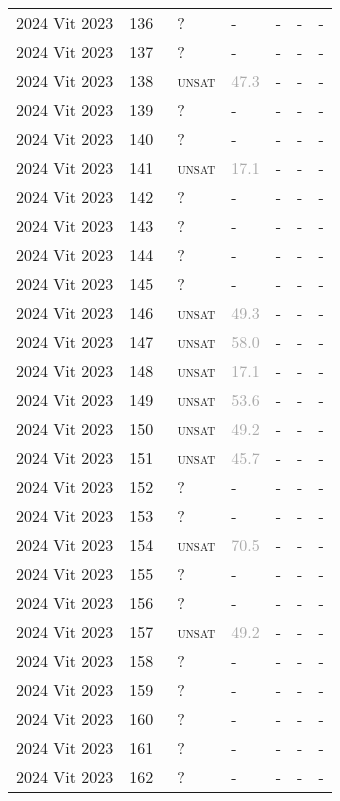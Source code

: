 \begin{center}
{\begin{longtable}{@{}lllllll@{}}
2024 Vit 2023 & 136 & ~? & - & - & - & - \\
2024 Vit 2023 & 137 & ~? & - & - & - & - \\
2024 Vit 2023 & 138 & ~\textsc{unsat} & \textcolor{darkgray}{47.3} & - & - & - \\
2024 Vit 2023 & 139 & ~? & - & - & - & - \\
2024 Vit 2023 & 140 & ~? & - & - & - & - \\
2024 Vit 2023 & 141 & ~\textsc{unsat} & \textcolor{darkgray}{17.1} & - & - & - \\
2024 Vit 2023 & 142 & ~? & - & - & - & - \\
2024 Vit 2023 & 143 & ~? & - & - & - & - \\
2024 Vit 2023 & 144 & ~? & - & - & - & - \\
2024 Vit 2023 & 145 & ~? & - & - & - & - \\
2024 Vit 2023 & 146 & ~\textsc{unsat} & \textcolor{darkgray}{49.3} & - & - & - \\
2024 Vit 2023 & 147 & ~\textsc{unsat} & \textcolor{darkgray}{58.0} & - & - & - \\
2024 Vit 2023 & 148 & ~\textsc{unsat} & \textcolor{darkgray}{17.1} & - & - & - \\
2024 Vit 2023 & 149 & ~\textsc{unsat} & \textcolor{darkgray}{53.6} & - & - & - \\
2024 Vit 2023 & 150 & ~\textsc{unsat} & \textcolor{darkgray}{49.2} & - & - & - \\
2024 Vit 2023 & 151 & ~\textsc{unsat} & \textcolor{darkgray}{45.7} & - & - & - \\
2024 Vit 2023 & 152 & ~? & - & - & - & - \\
2024 Vit 2023 & 153 & ~? & - & - & - & - \\
2024 Vit 2023 & 154 & ~\textsc{unsat} & \textcolor{darkgray}{70.5} & - & - & - \\
2024 Vit 2023 & 155 & ~? & - & - & - & - \\
2024 Vit 2023 & 156 & ~? & - & - & - & - \\
2024 Vit 2023 & 157 & ~\textsc{unsat} & \textcolor{darkgray}{49.2} & - & - & - \\
2024 Vit 2023 & 158 & ~? & - & - & - & - \\
2024 Vit 2023 & 159 & ~? & - & - & - & - \\
2024 Vit 2023 & 160 & ~? & - & - & - & - \\
2024 Vit 2023 & 161 & ~? & - & - & - & - \\
2024 Vit 2023 & 162 & ~? & - & - & - & - \\

\end{longtable}}
\end{center}
